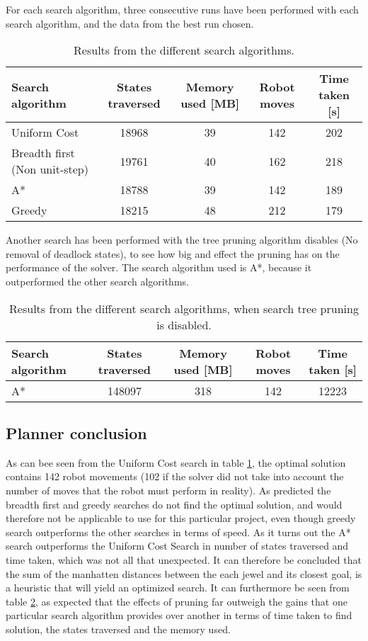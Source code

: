 For each search algorithm, three consecutive runs have been performed with each search algorithm, and the data from the best run chosen.\\

\begin{table}[h!]
	\centering
	\begin{tabular}{| l | c | c | c | c | }
		\hline
			Search algorithm	& States traversed & Memory used [MB] & Robot moves & Time taken [s]\\ \hline
	    	Uniform Cost & 18968 			& 39 		 & 142 	& 202\\\hline
		    Breadth first (Non unit-step)	& 19761 			& 40 		 & 162 	& 218\\\hline
		    A*		& 18788 			& 39 		 & 142 	& 189 \\\hline
	    	Greedy 		& 18215 			& 48 		 & 212 	& 179 \\
		\hline
	\end{tabular}
	\label{tbl:searchresults}
	\caption{Results from the different search algorithms.}
\end{table}
Another search has been performed with the tree pruning algorithm disables (No removal of deadlock states), to see how big and effect the pruning has on the performance of the solver. The search algorithm used is A*, because it outperformed the other search algorithms.\\
\begin{table}[h!]
	\centering
	\begin{tabular}{| l | c | c | c | c | }
		\hline
			Search algorithm	& States traversed & Memory used [MB] & Robot moves & Time taken [s]\\ \hline
		    A*		& 148097 			& 318 		 & 142 	& 12223 \\
		\hline
	\end{tabular}
	\label{tbl:searchresultsnoprun}
	\caption{Results from the different search algorithms, when search tree pruning is disabled.}
\end{table}


\subsection{Planner conclusion}
As can bee seen from the Uniform Cost search in table \ref{tbl:searchresults}, the optimal solution contains 142 robot movements (102 if the solver did not take into account the number of moves that the robot must perform in reality). As predicted the breadth first and greedy searches do not find the optimal solution, and would therefore not be applicable to use for this particular project, even though greedy search outperforms the other searches in terms of speed. As it turns out the A* search outperforms the Uniform Cost Search in number of states traversed and time taken, which was not all that unexpected. It can therefore be concluded that the sum of the manhatten distances between the each jewel and its closest goal, is a heuristic that will yield an optimized search. It can furthermore be seen from table \ref{tbl:searchresultsnoprun}, as expected that the effects of pruning far outweigh the gains that one particular search algorithm provides over another in terms of time taken to find solution, the states traversed and the memory used.
